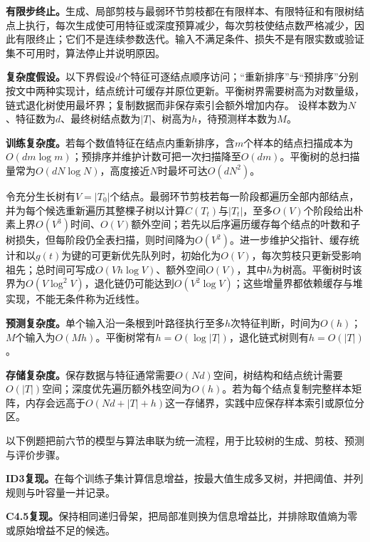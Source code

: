 \textbf{有限步终止。}生成、局部剪枝与最弱环节剪枝都在有限样本、有限特征和有限树结点上执行，每次生成使可用特征或深度预算减少，每次剪枝使结点数严格减少，因此有限终止；它们不是连续参数迭代。输入不满足条件、损失不是有限实数或验证集不可用时，算法停止并说明原因。

\label{struct:V2-C04-CH26}
\label{struct:V2-C04-CH27}
\begin{complexitybox}
\textbf{复杂度假设。}以下界假设$d$个特征可逐结点顺序访问；“重新排序”与“预排序”分别按文中两种实现计，结点统计可缓存并原位更新。平衡树界需要树高为对数量级，链式退化树使用最坏界；复制数据而非保存索引会额外增加内存。
设样本数为$N$、特征数为$d$、最终树结点数为$|T|$、树高为$h$，待预测样本数为$M$。

\textbf{训练复杂度。}若每个数值特征在结点内重新排序，含$m$个样本的结点扫描成本为$O(dm\log m)$；预排序并维护计数可把一次扫描降至$O(dm)$。平衡树的总扫描量常为$O(dN\log N)$，高度接近$N$时最坏可达$O(dN^2)$。

令充分生长树有$V=|T_0|$个结点。最弱环节剪枝若每一阶段都遍历全部内部结点，并为每个候选重新遍历其整棵子树以计算$C(T_t)$与$|T_t|$，至多$O(V)$个阶段给出朴素上界$O(V^3)$时间、$O(V)$额外空间；若先以后序遍历缓存每个结点的叶数和子树损失，但每阶段仍全表扫描，则时间降为$O(V^2)$。进一步维护父指针、缓存统计和以$g(t)$为键的可更新优先队列时，初始化为$O(V)$，每次剪枝只更新受影响祖先；总时间可写成$O(Vh\log V)$、额外空间$O(V)$，其中$h$为树高。平衡树时该界为$O(V\log^2V)$，退化链仍可能达到$O(V^2\log V)$；这些增量界都依赖缓存与堆实现，不能无条件称为近线性。

\textbf{预测复杂度。}单个输入沿一条根到叶路径执行至多$h$次特征判断，时间为$O(h)$；$M$个输入为$O(Mh)$。平衡树常有$h=O(\log |T|)$，退化链式树则有$h=O(|T|)$。

\textbf{存储复杂度。}保存数据与特征通常需要$O(Nd)$空间，树结构和结点统计需要$O(|T|)$空间；深度优先遍历额外栈空间为$O(h)$。若为每个结点复制完整样本矩阵，内存会远高于$O(Nd+|T|+h)$这一存储界，实践中应保存样本索引或原位分区。
\end{complexitybox}


以下例题把前六节的模型与算法串联为统一流程，用于比较树的生成、剪枝、预测与评价步骤。

\label{replay:V2-C04-S07-SLM-05-02-005}
\textbf{ID3复现。}在每个训练子集计算信息增益，按最大值生成多叉树，并把阈值、并列规则与叶容量一并记录。

\label{replay:V2-C04-S07-SLM-05-03-004}
\textbf{C4.5复现。}保持相同递归骨架，把局部准则换为信息增益比，并排除取值熵为零或原始增益不足的候选。

